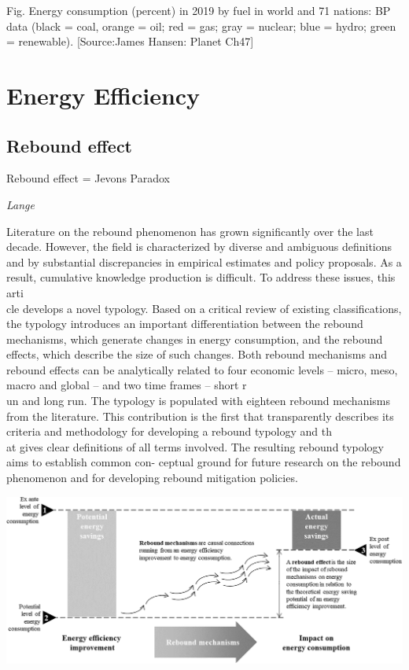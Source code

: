 \documentclass[
]{book}
\begin{document}
Fig. Energy consumption (percent) in 2019 by fuel in world and 71 nations: BP data
(black = coal, orange = oil; red = gas; gray = nuclear; blue = hydro; green = renewable).
{[}Source:James Hansen: Planet Ch47{]}

\hypertarget{energy-efficiency}{%
\section{Energy Efficiency}\label{energy-efficiency}}

\hypertarget{rebound-effect}{%
\subsection{Rebound effect}\label{rebound-effect}}

Rebound effect = Jevons Paradox

\emph{Lange}

Literature on the rebound phenomenon has grown significantly over the last decade. However, the field is
characterized by diverse and ambiguous definitions and by substantial discrepancies in empirical estimates and
policy proposals. As a result, cumulative knowledge production is difficult. To address these issues, this arti\\
cle
develops a novel typology. Based on a critical review of existing classifications, the typology introduces an
important differentiation between the rebound mechanisms, which generate changes in energy consumption, and
the rebound effects, which describe the size of such changes. Both rebound mechanisms and rebound effects can
be analytically related to four economic levels -- micro, meso, macro and global -- and two time frames -- short r\\
un
and long run. The typology is populated with eighteen rebound mechanisms from the literature. This contribution
is the first that transparently describes its criteria and methodology for developing a rebound typology and th\\
at
gives clear definitions of all terms involved. The resulting rebound typology aims to establish common con-
ceptual ground for future research on the rebound phenomenon and for developing rebound mitigation policies.

\includegraphics{fig/lange_rebound.png}
\end{document}
